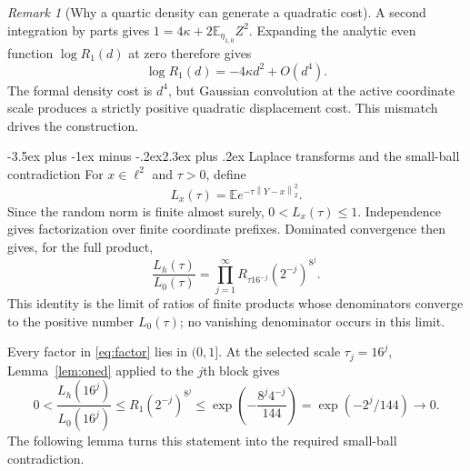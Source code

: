 \documentclass[11pt]{article}
\makeatletter
\renewcommand{\section}{\@startsection{section}{1}{0pt}
  {-3.5ex plus -1ex minus -.2ex}{2.3ex plus .2ex}
  {\normalfont\large\bfseries\color{MidnightBlue}}}
\theoremstyle{remark}
\newtheorem{remark}[theorem]{Remark}
\newcommand{\E}{\mathbb E}
\newcommand{\norm}[1]{\left\lVert #1\right\rVert}
\makeatother
\begin{document}
\begin{remark}[Why a quartic density can generate a quadratic cost]\label{rem:quadratic}
A second integration by parts gives
$1=4\kappa+2\E_{\eta_{1,0}}Z^2$. Expanding the analytic even function $\log R_1(d)$ at zero therefore gives
\[
\log R_1(d)=-4\kappa d^2+O(d^4).
\]
The formal density cost is $d^4$, but Gaussian convolution at the active coordinate scale produces a strictly positive quadratic displacement cost. This mismatch drives the construction.
\end{remark}

\section{Laplace transforms and the small-ball contradiction}
For $x\in\ell^2$ and $\tau>0$, define
\begin{equation}\label{eq:Laplace}
L_x(\tau)=\E e^{-\tau\norm{Y-x}_2^2}.
\end{equation}
Since the random norm is finite almost surely, $0<L_x(\tau)\le1$.
Independence gives factorization over finite coordinate prefixes. Dominated convergence then gives, for the full product,
\begin{equation}\label{eq:factor}
\frac{L_h(\tau)}{L_0(\tau)}
=\prod_{j=1}^{\infty}R_{\tau16^{-j}}(2^{-j})^{8^j}.
\end{equation}
This identity is the limit of ratios of finite products whose denominators converge to the positive number $L_0(\tau)$; no vanishing denominator occurs in this limit.

Every factor in \eqref{eq:factor} lies in $(0,1]$. At the selected scale $\tau_j=16^j$, Lemma~\ref{lem:oned} applied to the $j$th block gives
\begin{equation}\label{eq:Laplace-upper}
0<\frac{L_h(16^j)}{L_0(16^j)}
\le R_1(2^{-j})^{8^j}
\le\exp\left(-\frac{8^j4^{-j}}{144}\right)
=\exp(-2^j/144)\longrightarrow0.
\end{equation}
The following lemma turns this statement into the required small-ball contradiction.
\end{document}
